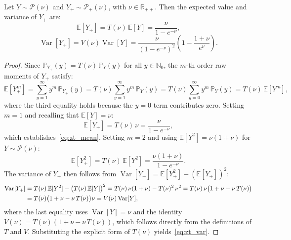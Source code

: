 \documentclass[10pt,a4paper]{amsart}
\begin{document}
\begin{proposition}
Let $Y \sim \mathcal{P}(\nu)$ and $Y_+ \sim \mathcal{P}_+(\nu)$, with $\nu \in \mathbb{R}_{++}$. 
Then the expected value and variance of $Y_+$ are:
\begin{equation}
    \mathbb{E}[Y_+] = T(\nu)\,\mathbb{E}[Y] = \frac{\nu}{1 - e^{-\nu}}, 
    \label{eq:zt_mean}
\end{equation}
\begin{equation}
    \operatorname{Var}[Y_+] = V(\nu)\operatorname{Var}[Y] 
    = \frac{\nu}{(1-e^{-\nu})^2}\!\left(1 - \frac{1+\nu}{e^\nu}\right).
    \label{eq:zt_var}
\end{equation}
\end{proposition}

\begin{proof}
Since $\mathbb{P}_{Y_+}(y) = T(\nu)\,\mathbb{P}_Y(y)$ for all $y \in \mathbb{N}_0$, the 
$m$-th order raw moments of $Y_+$ satisfy:
\begin{equation}
    \mathbb{E}[Y_+^m] = \sum_{y=1}^{\infty} y^m\,\mathbb{P}_{Y_+}(y) 
    = T(\nu)\sum_{y=1}^{\infty} y^m\,\mathbb{P}_Y(y) 
    = T(\nu)\sum_{y=0}^{\infty} y^m\,\mathbb{P}_Y(y) 
    = T(\nu)\,\mathbb{E}[Y^m],
\end{equation}
where the third equality holds because the $y=0$ term contributes zero. Setting $m=1$ 
and recalling that $\mathbb{E}[Y] = \nu$:
\begin{equation}
    \mathbb{E}[Y_+] = T(\nu)\,\nu = \frac{\nu}{1 - e^{-\nu}},
\end{equation}
which establishes~\eqref{eq:zt_mean}. Setting $m=2$ and using $\mathbb{E}[Y^2] = 
\nu(1+\nu)$ for $Y\sim\mathcal{P}(\nu)$:
\begin{equation}
    \mathbb{E}[Y_+^2] = T(\nu)\,\mathbb{E}[Y^2] = \frac{\nu(1+\nu)}{1 - e^{-\nu}}.
\end{equation}
The variance of $Y_+$ then follows from $\operatorname{Var}[Y_+] = \mathbb{E}[Y_+^2] - 
(\mathbb{E}[Y_+])^2$:
\begin{align}
    \operatorname{Var}[Y_+] 
    &= T(\nu)\,\mathbb{E}[Y^2] - \bigl(T(\nu)\,\mathbb{E}[Y]\bigr)^2 = T(\nu)\,\nu(1+\nu) - T(\nu)^2\,\nu^2 \notag= T(\nu)\,\nu\bigl(1 + \nu - \nu\,T(\nu)\bigr) \notag\\
    &= T(\nu)\bigl(1 + \nu - \nu\,T(\nu)\bigr)\nu = V(\nu)\operatorname{Var}[Y],
\end{align}
where the last equality uses $\operatorname{Var}[Y] = \nu$ and the identity 
$V(\nu) = T(\nu)(1 + \nu - \nu\,T(\nu))$, which follows directly from the definitions 
of $T$ and $V$. Substituting the explicit form of $T(\nu)$ yields~\eqref{eq:zt_var}.
\end{proof}
\end{document}
